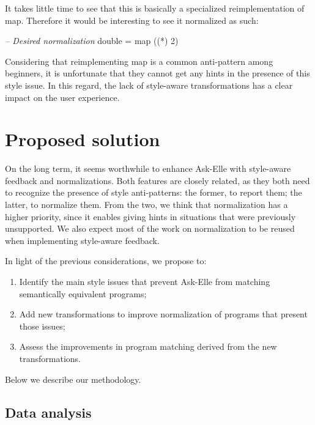 \documentclass[a4paperpaper,]{report}
\newenvironment{Shaded}{}{}
\newcommand{\DecValTok}[1]{\textcolor[rgb]{0.25,0.63,0.44}{#1}}
\newcommand{\CommentTok}[1]{\textcolor[rgb]{0.38,0.63,0.69}{\textit{#1}}}
\newcommand{\FunctionTok}[1]{\textcolor[rgb]{0.02,0.16,0.49}{#1}}
\newcommand{\NormalTok}[1]{#1}
\providecommand{\tightlist}{%
  \setlength{\itemsep}{0pt}\setlength{\parskip}{0pt}}
\begin{document}
It takes little time to see that this is basically a specialized
reimplementation of map. Therefore it would be interesting to see it
normalized as such:

\begin{Shaded}
\begin{Highlighting}[]
\CommentTok{-- Desired normalization}
\NormalTok{double }\FunctionTok{=}\NormalTok{ map ((}\FunctionTok{*}\NormalTok{) }\DecValTok{2}\NormalTok{)}
\end{Highlighting}
\end{Shaded}

Considering that reimplementing map is a common anti-pattern among
beginners, it is unfortunate that they cannot get any hints in the
presence of this style issue. In this regard, the lack of style-aware
transformations has a clear impact on the user experience.

\hypertarget{proposed-solution}{%
\section{Proposed solution}\label{proposed-solution}}

On the long term, it seems worthwhile to enhance Ask-Elle with
style-aware feedback and normalizations. Both features are closely
related, as they both need to recognize the presence of style
anti-patterns: the former, to report them; the latter, to normalize
them. From the two, we think that normalization has a higher priority,
since it enables giving hints in situations that were previously
unsupported. We also expect most of the work on normalization to be
reused when implementing style-aware feedback.

In light of the previous considerations, we propose to:

\begin{enumerate}
\def\labelenumi{\arabic{enumi}.}
\tightlist
\item
  Identify the main style issues that prevent Ask-Elle from matching
  semantically equivalent programs;
\item
  Add new transformations to improve normalization of programs that
  present those issues;
\item
  Assess the improvements in program matching derived from the new
  transformations.
\end{enumerate}

Below we describe our methodology.

\hypertarget{data-analysis}{%
\subsection{Data analysis}\label{data-analysis}}
\end{document}
